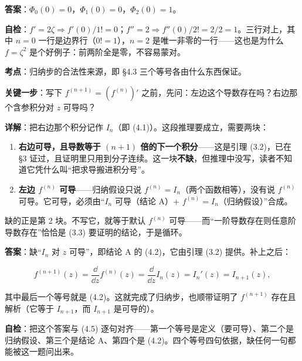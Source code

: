 \documentclass[11pt]{ctexart}
\renewcommand{\qbreak}{\needspace{0.45\textheight}}
\let\origsubhdr\subhdr
\renewcommand{\subhdr}[1]{\par\origsubhdr{#1}}
\begin{document}
\noindent\textbf{答案}：$\Phi_0(0)=0$，$\Phi_1(0)=0$，$\Phi_2(0)=1$。

\noindent\textbf{自检}：$f'=2\zeta\Rightarrow f'(0)/1!=0$；$f''=2\Rightarrow f''(0)/2!=2/2=1$。三行对上，其中 $n=0$ 一行是边界行（$0!=1$），$n=2$ 是唯一非零的一行——这也是为什么 $f=\zeta^2$ 是个好例子：前两阶全是零，不容易蒙对。

\qbreak
{}


\noindent\textbf{考点}：归纳步的合法性来源，即 §4.3 三个等号各由什么东西保证。

\noindent\textbf{关键一步}：写下 $f^{(n+1)}=(f^{(n)})'$ 之前，先问：左边这个导数存在吗？右边那个含参积分对 $z$ 可导吗？

\noindent\textbf{详解}：把右边那个积分记作 $I_n$（即 (4.1)）。这段推理要成立，需要两块：

\begin{enumerate}[leftmargin=1.9em]
\item \textbf{右边可导，且导数等于 $(n+1)$ 倍的下一个积分}——这是引理 (3.2)，已在 §3 证过，且证明里只用到分子连续。这一块\textbf{不缺}，但推理中没写，读者不知道它凭什么叫“把求导搬进积分号”。
\item \textbf{左边 $f^{(n)}$ 可导}——归纳假设只说 $f^{(n)}=I_n$（两个函数相等），没有说 $f^{(n)}$ 可导。它可导，必须由“$I_n$ 可导（结论 A）+ $f^{(n)}=I_n$（归纳假设）”合成。
\end{enumerate}

缺的正是第 2 块。不写它，就等于默认 $f^{(n)}$ 可导——而“一阶导数存在则任意阶导数存在”恰恰是 (3.3) 要证明的结论，于是循环。

\noindent\textbf{答案}：缺“$I_n$ 对 $z$ 可导”，即结论 A 的 (4.2)，它由引理 (3.2) 提供。补上之后：

\begin{equation*}
f^{(n+1)}(z)=\frac{\dd}{\dd z}f^{(n)}(z)=\frac{\dd}{\dd z}I_n(z)=I_n'(z)=I_{n+1}(z),
\end{equation*}

其中最后一个等号就是 (4.2)。这就完成了归纳步，也顺带证明了 $f^{(n+1)}$ 存在且解析（它等于 $I_{n+1}$，而 $I_{n+1}$ 是可导的）。

\noindent\textbf{自检}：把这个答案与 (4.5) 逐句对齐——第一个等号是定义（要可导）、第二个是归纳假设、第三个是结论 A、第四个是 (4.2)。四个等号四句依据，缺任何一句都能被这一题问出来。
\end{document}
